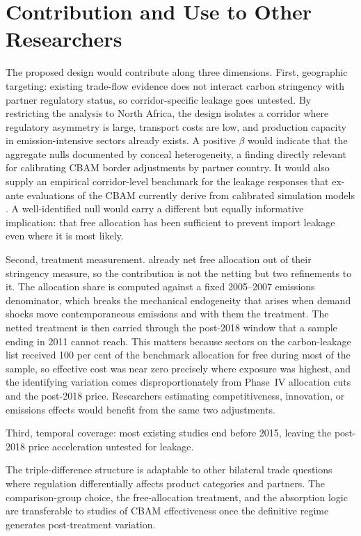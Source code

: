 \section{Contribution and Use to Other Researchers}
\label{sec:contribution}

The proposed design would contribute along three dimensions. First, geographic targeting: existing trade-flow evidence does not interact carbon stringency with partner regulatory status, so corridor-specific leakage goes untested. By restricting the analysis to North Africa, the design isolates a corridor where regulatory asymmetry is large, transport costs are low, and production capacity in emission-intensive sectors already exists. A positive $\beta$ would indicate that the aggregate nulls documented by \citet{naegele2019} conceal heterogeneity, a finding directly relevant for calibrating CBAM border adjustments by partner country. It would also supply an empirical corridor-level benchmark for the leakage responses that ex-ante evaluations of the CBAM currently derive from calibrated simulation models \citep{bellora2023}. A well-identified null would carry a different but equally informative implication: that free allocation has been sufficient to prevent import leakage even where it is most likely.

Second, treatment measurement. \citet{naegele2019} already net free allocation out of their stringency measure, so the contribution is not the netting but two refinements to it. The allocation share is computed against a fixed 2005--2007 emissions denominator, which breaks the mechanical endogeneity that arises when demand shocks move contemporaneous emissions and with them the treatment. The netted treatment is then carried through the post-2018 window that a sample ending in 2011 cannot reach. This matters because sectors on the carbon-leakage list received 100 per cent of the benchmark allocation for free during most of the sample, so effective cost was near zero precisely where exposure was highest, and the identifying variation comes disproportionately from Phase~IV allocation cuts and the post-2018 price. Researchers estimating competitiveness, innovation, or emissions effects would benefit from the same two adjustments.

Third, temporal coverage: most existing studies end before 2015, leaving the post-2018 price acceleration untested for leakage.

The triple-difference structure is adaptable to other bilateral trade questions where regulation differentially affects product categories and partners. The comparison-group choice, the free-allocation treatment, and the absorption logic are transferable to studies of CBAM effectiveness once the definitive regime generates post-treatment variation.
